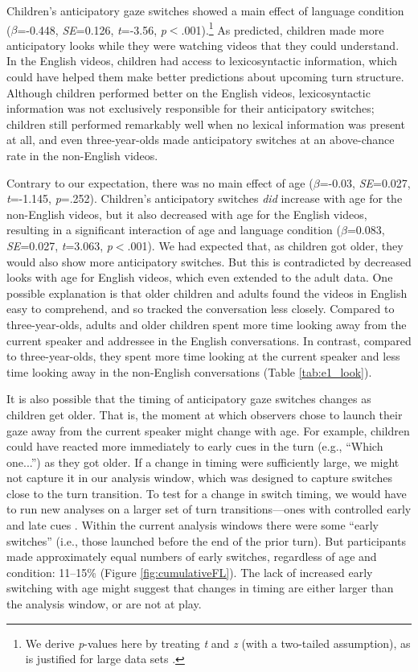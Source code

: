 \documentclass[authoryear, 12pt]{elsarticle}
\begin{document}
Children's anticipatory gaze switches showed a main effect of language condition (\textit{$\beta$}=-0.448, \textit{SE}=0.126, \textit{t}=-3.56, \textit{p}$<$.001).\footnote{We derive \textit{p}-values here by treating \textit{t} and \textit{z} (with a two-tailed assumption), as is justified for large data sets \citep{barr2013}.} As predicted, children made more anticipatory looks while they were watching videos that they could understand. In the English videos, children had access to lexicosyntactic information, which could have helped them make better predictions about upcoming turn structure. Although children performed better on the English videos, lexicosyntactic information was not exclusively responsible for their anticipatory switches; children still performed remarkably well when no lexical information was present at all, and even three-year-olds made anticipatory switches at an above-chance rate in the non-English videos.

Contrary to our expectation, there was no main effect of age (\textit{$\beta$}=-0.03, \textit{SE}=0.027, \textit{t}=-1.145, \textit{p}=.252). Children's anticipatory switches \textit{did} increase with age for the non-English videos, but it also decreased with age for the English videos, resulting in a significant interaction of age and language condition (\textit{$\beta$}=0.083, \textit{SE}=0.027, \textit{t}=3.063, \textit{p}$<$.001). We had expected that, as children got older, they would also show more anticipatory switches. But this is contradicted by decreased looks with age for English videos, which even extended to the adult data. One possible explanation is that older children and adults found the videos in English easy to comprehend, and so tracked the conversation less closely. Compared to three-year-olds, adults and older children spent more time looking away from the current speaker and addressee in the English conversations. In contrast, compared to three-year-olds, they spent more time looking at the current speaker and less time looking away in the non-English conversations (Table \ref{tab:e1_look}).

It is also possible that the timing of anticipatory gaze switches changes as children get older. That is, the moment at which observers chose to launch their gaze away from the current speaker might change with age. For example, children could have reacted more immediately to early cues in the turn (e.g., ``Which one...'') as they got older. If a change in timing were sufficiently large, we might not capture it in our analysis window, which was designed to capture switches close to the turn transition. To test for a change in switch timing, we would have to run new analyses on a larger set of turn transitions---ones with controlled early and late cues \citep[see, e.g.,][]{bogelsmagyariInPrep}. Within the current analysis windows there were some ``early switches'' (i.e., those launched before the end of the prior turn). But participants made approximately equal numbers of early switches, regardless of age and condition: 11--15\% (Figure \ref{fig:cumulativeFL}). The lack of increased early switching with age might suggest that changes in timing are either larger than the analysis window, or are not at play.
\end{document}
